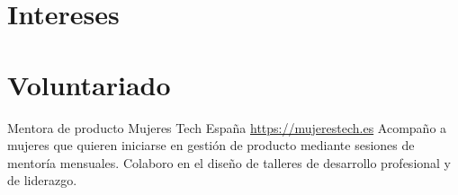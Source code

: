 \documentclass[a4paper, serif, 10pt]{moderncv}
\begin{document}
\section{Intereses}

\section{Voluntariado}

        {Mentora de producto}
        {Mujeres Tech España}
        {\url{https://mujerestech.es}}
        {}
        {Acompaño a mujeres que quieren iniciarse en gestión de producto mediante sesiones de mentoría mensuales.
Colaboro en el diseño de talleres de desarrollo profesional y de liderazgo.}
    
\end{document}
